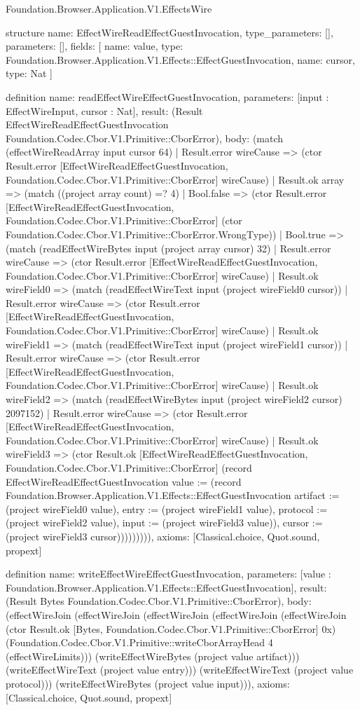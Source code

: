 \begin{lexlean}{Foundation.Browser.Application.V1.EffectsWire}
\begin{semanticmodule}
structure{
  name: EffectWireReadEffectGuestInvocation,
  type_parameters: [],
  parameters: [],
  fields: [
    {name: value, type: Foundation.Browser.Application.V1.Effects::EffectGuestInvocation},
    {name: cursor, type: Nat}
  ]
}

definition{
  name: readEffectWireEffectGuestInvocation,
  parameters: [input : EffectWireInput, cursor : Nat],
  result: (Result EffectWireReadEffectGuestInvocation Foundation.Codec.Cbor.V1.Primitive::CborError),
  body: (match (effectWireReadArray input cursor 64)
    | Result.error wireCause => (ctor Result.error [EffectWireReadEffectGuestInvocation, Foundation.Codec.Cbor.V1.Primitive::CborError] wireCause)
    | Result.ok array => (match ((project array count) =? 4)
      | Bool.false => (ctor Result.error [EffectWireReadEffectGuestInvocation, Foundation.Codec.Cbor.V1.Primitive::CborError] (ctor Foundation.Codec.Cbor.V1.Primitive::CborError.WrongType))
      | Bool.true => (match (readEffectWireBytes input (project array cursor) 32)
        | Result.error wireCause => (ctor Result.error [EffectWireReadEffectGuestInvocation, Foundation.Codec.Cbor.V1.Primitive::CborError] wireCause)
        | Result.ok wireField0 => (match (readEffectWireText input (project wireField0 cursor))
          | Result.error wireCause => (ctor Result.error [EffectWireReadEffectGuestInvocation, Foundation.Codec.Cbor.V1.Primitive::CborError] wireCause)
          | Result.ok wireField1 => (match (readEffectWireText input (project wireField1 cursor))
            | Result.error wireCause => (ctor Result.error [EffectWireReadEffectGuestInvocation, Foundation.Codec.Cbor.V1.Primitive::CborError] wireCause)
            | Result.ok wireField2 => (match (readEffectWireBytes input (project wireField2 cursor) 2097152)
              | Result.error wireCause => (ctor Result.error [EffectWireReadEffectGuestInvocation, Foundation.Codec.Cbor.V1.Primitive::CborError] wireCause)
              | Result.ok wireField3 => (ctor Result.ok [EffectWireReadEffectGuestInvocation, Foundation.Codec.Cbor.V1.Primitive::CborError] (record EffectWireReadEffectGuestInvocation {value := (record Foundation.Browser.Application.V1.Effects::EffectGuestInvocation {artifact := (project wireField0 value), entry := (project wireField1 value), protocol := (project wireField2 value), input := (project wireField3 value)}), cursor := (project wireField3 cursor)})))))))),
  axioms: [Classical.choice, Quot.sound, propext]
}

definition{
  name: writeEffectWireEffectGuestInvocation,
  parameters: [value : Foundation.Browser.Application.V1.Effects::EffectGuestInvocation],
  result: (Result Bytes Foundation.Codec.Cbor.V1.Primitive::CborError),
  body: (effectWireJoin (effectWireJoin (effectWireJoin (effectWireJoin (effectWireJoin (ctor Result.ok [Bytes, Foundation.Codec.Cbor.V1.Primitive::CborError] 0x) (Foundation.Codec.Cbor.V1.Primitive::writeCborArrayHead 4 (effectWireLimits))) (writeEffectWireBytes (project value artifact))) (writeEffectWireText (project value entry))) (writeEffectWireText (project value protocol))) (writeEffectWireBytes (project value input))),
  axioms: [Classical.choice, Quot.sound, propext]
}


\end{semanticmodule}
\end{lexlean}
